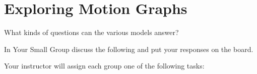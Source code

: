 \section{Exploring Motion Graphs}
\label{act8.2.2}

\begin{fnt}
	
\end{fnt}

\begin{fnt}
	
\end{fnt}

\begin{fnt}
	
\end{fnt}

%	

What kinds of questions can the various models answer?

In Your Small Group discuss the following and put your responses on the board.

Your instructor will assign each group one of the following tasks:

